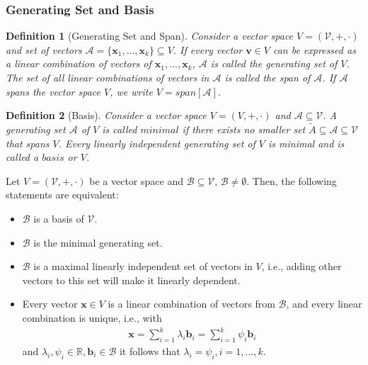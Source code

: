 \documentclass{article}
\newtheorem{definition}{Definition}[section]
\begin{document}
	\subsubsection{Generating Set and Basis}
	\begin{definition}[Generating Set and Span]
		\normalfont Consider a vector space $\textit{V} = (\mathcal{V}, +, \cdot)$ and set of vectors $\mathcal{A} = \{\boldsymbol{x}_1,\ldots,\boldsymbol{x}_k\} \subseteq \textit{V}$. If every vector $\boldsymbol{v} \in \mathit{V}$ can be expressed as a linear combination of vectors of $\boldsymbol{x}_1,\ldots,\boldsymbol{x}_k$, $\mathcal{A}$ is called the generating set of $\textit{V}$. The set of all linear combinations of vectors in $\mathcal{A}$ is called the span of $\mathcal{A}$. If $\mathcal{A}$ spans the vector space $\textit{V}$, we write $\textit{V} = span[\mathcal{A}]$. 
	\end{definition}
	\begin{definition}[Basis]
		\normalfont Consider a vector space $\textit{V} = (\textit{V}, +, \cdot)$ and $\mathcal{A} \subseteq \mathcal{V}$. A generating set $\mathcal{A}$ of $\textit{V}$ is called $\textit{minimal}$ if there exists no smaller set $\tilde{A} \subseteq \mathcal{A} \subseteq \mathcal{V}$ that spans $\textit{V}$. Every linearly independent generating set of $\textit{V}$  is minimal and is called a $\mathit{basis}$ or $\textit{V}$.
	\end{definition}
	Let $\textit{V} = (\mathcal{V}, +, \cdot)$ be a vector space and $\mathcal{B} \subseteq \mathcal{V}$, $\mathcal{B} \ne \emptyset$. Then, the following statements are equivalent:
	\begin{itemize}
		\item $\mathcal{B}$ is a basis of $\mathcal{V}$. 
		\item $\mathcal{B}$ is the minimal generating set. 
		\item $\mathcal{B}$ is a maximal linearly independent set of vectors in $\textit{V}$, i.e., adding other vectors to this set will make it linearly dependent. 
		\item Every vector $\boldsymbol{x} \in \textit{V}$ is a linear combination of vectors from $\mathcal{B}$, and every linear combination is unique, i.e., with 
		\begin{align}
			\boldsymbol{x} = \sum_{i=1}^{k} \lambda_i\boldsymbol{b}_i = \sum_{i=1}^{k}\psi_i\boldsymbol{b}_i 
		\end{align} 
		and $\lambda_i,\psi_i \in \mathbb{R}, \boldsymbol{b}_i \in \mathcal{B}$ it follows that $\lambda_i = \psi_i, i = 1,\ldots,k$.
	\end{itemize} 
\end{document}
